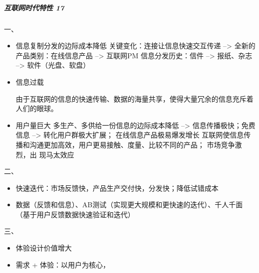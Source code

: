 \documentclass[letterpaper,11pt,english]{sphinxmanual}
\begin{document}
\subparagraph{互联网时代特性 17\sphinxfootnotemark[217]}
\label{\detokenize{chapter_introduction/AI_PM:id3}}%
\begin{footnotetext}[217]\sphinxAtStartFootnote
{}
%
\end{footnotetext}\ignorespaces 
一、
\begin{itemize}
\item {} 
信息复制分发的边际成本降低  关键变化：连接让信息快速交互传递 –>
全新的产品类别：在线信息产品 –> 互联网PM 信息分发历史：信件 –>
报纸、杂志 –> 软件（光盘、软盘）

\item {} 
信息过载
%
\begin{footnote}[218]\sphinxAtStartFootnote
{}
%
\end{footnote}
由于互联网的信息的快速传输、数据的海量共享，使得大量冗余的信息充斥着人们的眼球。

\item {} 
用户量巨大 多生产、多供给一份信息的边际成本降低 –>
信息传播极快；免费信息 –> 转化用户群极大扩展； 
在线信息产品极易爆发增长
互联网使信息传播和沟通更加高效，用户更易接触、度量、比较不同的产品；
市场竞争激烈，出 现马太效应

\end{itemize}

二、
\begin{itemize}
\item {} 
快速迭代：市场反馈快，产品生产交付快，分发快；降低试错成本

\item {} 
数据（反馈和信息）、AB测试（实现更大规模和更快速的迭代）、千人千面（基于用户反馈数据快速验证和迭代）

\end{itemize}

三、
\begin{itemize}
\item {} 
体验设计价值增大

\item {} 
需求 + 体验：以用户为核心，

\end{itemize}
\end{document}
